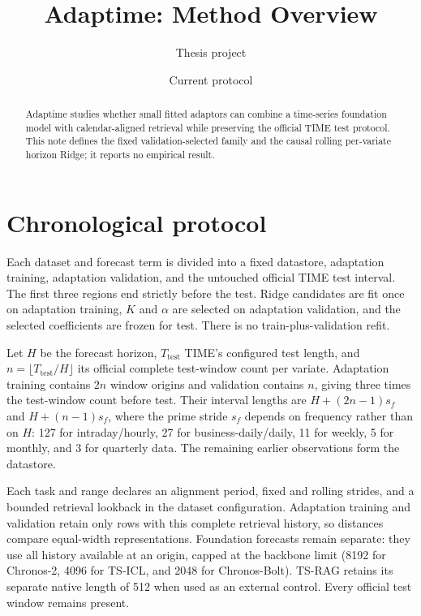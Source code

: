 \documentclass[10pt]{article}
\title{Adaptime: Method Overview}
\author{Thesis project}
\date{Current protocol}
\begin{document}
\maketitle

\begin{abstract}
Adaptime studies whether small fitted adaptors can combine a time-series
foundation model with calendar-aligned retrieval while preserving the official
TIME test protocol. This note defines the fixed validation-selected family and
the causal rolling per-variate horizon Ridge; it reports no empirical result.
\end{abstract}

\section{Chronological protocol}

Each dataset and forecast term is divided into a fixed datastore, adaptation
training, adaptation validation, and the untouched official TIME test interval.
The first three regions end strictly before the test. Ridge candidates are fit
once on adaptation training, $K$ and $\alpha$ are selected on adaptation
validation, and the selected coefficients are frozen for test. There is no
train-plus-validation refit.

Let $H$ be the forecast horizon, $T_{\mathrm{test}}$ TIME's configured test
length, and $n=\lfloor T_{\mathrm{test}}/H\rfloor$ its official complete
test-window count per variate. Adaptation training contains $2n$ window
origins and validation contains $n$, giving three times the test-window count
before test. Their interval lengths are $H+(2n-1)s_f$ and
$H+(n-1)s_f$, where the prime stride $s_f$ depends on frequency rather than
on $H$: 127 for intraday/hourly, 27 for business-daily/daily, 11 for weekly,
5 for monthly, and 3 for quarterly data. The remaining earlier observations
form the datastore.

Each task and range declares an alignment period, fixed and rolling strides,
and a bounded retrieval lookback in the dataset configuration. Adaptation
training and validation retain only rows with this complete retrieval history,
so distances compare equal-width representations. Foundation forecasts remain
separate: they use all history available at an origin, capped at the backbone
limit (8192 for Chronos-2, 4096 for TS-ICL, and 2048 for Chronos-Bolt).
TS-RAG retains its separate native length of 512 when used as an external
control. Every official test window remains present.
\end{document}
